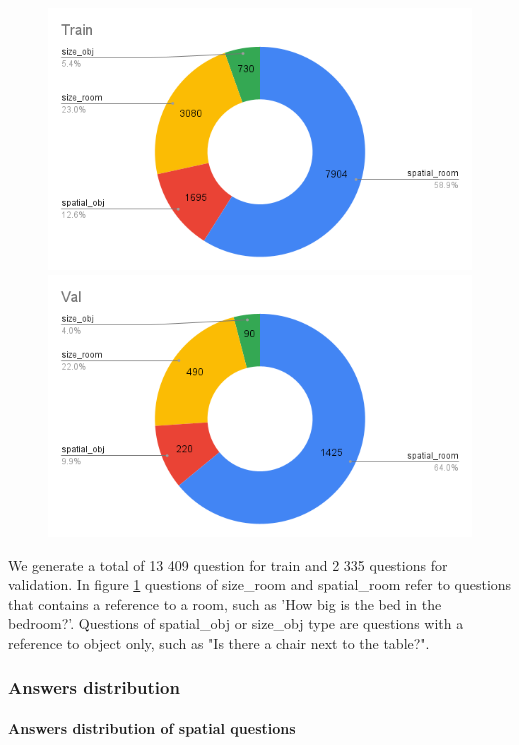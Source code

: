 \begin{figure}[H]
\includegraphics[scale=0.25]{images/GenTrain.png}
\includegraphics[scale=0.25]{images/GenVal.png}
\caption{}
\label{fig:questionGen}
\end{figure}

We generate a total of 13 409 question for train and 2 335 questions for validation.  In figure \ref{fig:questionGen} questions of size\_room and spatial\_room refer to questions that contains a reference to a room, such as 'How big is the bed in the bedroom?'. Questions of spatial\_obj or size\_obj type are questions with a reference to object only, such as "Is there a chair next to the table?". 

\subsubsection{Answers distribution}

\paragraph{Answers distribution of spatial questions}

